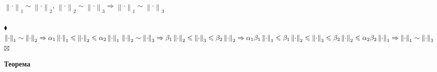 \documentclass[a4paper, 12pt]{report}
\begin{document}
\begin{enumerate}
		$\left \| \cdot \right \|_1 \sim \left \| \cdot \right \|_2$, $\left \| \cdot \right \|_2 \sim \left \| \cdot \right \|_3 \Rightarrow \left \| \cdot \right \|_1 \sim \left \| \cdot \right \|_3  $\\\\
		$\blacklozenge\ $
		$\left \| \cdot \right \|_1 \sim \left \| \cdot \right \|_2 \Rightarrow \alpha_1\left \| \cdot \right \|_1 \leqslant \left \| \cdot \right \|_2 \leqslant \alpha_2\left \| \cdot \right \|_1\\
		\left \| \cdot \right \|_2 \sim \left \| \cdot \right \|_3 \Rightarrow \beta_1\left \| \cdot \right \|_2 \leqslant \left \| \cdot \right \|_3 \leqslant \beta_2 \left \| \cdot \right \|_2 \Rightarrow\\
		\alpha_1\beta_1\left \| \cdot \right \|_1 \leqslant \beta_1\left \| \cdot \right \|_2 \leqslant \left \| \cdot \right \|_3 \leqslant \beta_2 \left \| \cdot \right \|_2 \leqslant \alpha_2 \beta_2 \left \| \cdot \right \|_1 \Rightarrow \left \| \cdot \right \|_1 \sim \left \| \cdot \right \|_3$
		$\boxtimes$
	\end{enumerate}
	\par\bigskip
	\textbf{Теорема}
	
\end{document}
